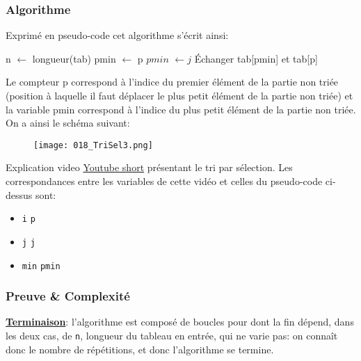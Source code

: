\documentclass[12pt]{article}
\begin{document}
	\subsubsection*{Algorithme}
	\begin{MaReponse}
		Exprimé en pseudo-code cet algorithme s'écrit ainsi:
		
		\begin{algorithmic}[1]
			\State n $\leftarrow$ longueur(tab)
			\State pmin $\leftarrow$ p
			\State $pmin$ $\leftarrow j$
			\EndIf
			\EndFor
			\State Échanger tab[pmin] et tab[p]
			\EndFor
			\State{}
			\EndFunction
		\end{algorithmic}
		
		Le compteur p correspond à l'indice du premier élément de la partie non triée (position à laquelle il faut déplacer le plus petit élément de la partie non triée) et la variable pmin correspond à l’indice du plus petit élément de la partie non triée. On a ainsi le schéma suivant:
		\begin{figure}[H]
			\centering
			\texttt{[image: 018\_TriSel3.png]}
		\end{figure}
	\end{MaReponse}
	
	\begin{MonAmp}{Explication video}
		\href{https://www.youtube.com/shorts/HRwi5gwlB0U?feature=share}{Youtube short} présentant le tri par sélection. Les correspondances entre les variables de cette vidéo et celles du pseudo-code ci-dessus sont:
		\begin{itemize}
			\item \texttt{i} \quad \faExchange \quad \texttt{p}
			\item \texttt{j} \quad \faExchange \quad \texttt{j}
			\item \texttt{min} \quad \faExchange \quad \texttt{pmin}
		\end{itemize}
	\end{MonAmp}
	
	\subsubsection*{Preuve \& Complexité}
	\textbf{\uline{Terminaison}}: l'algorithme est composé de boucles pour dont la fin dépend, dans les deux cas, de \texttt{n}, longueur du tableau en entrée, qui ne varie pas: on connaît donc le nombre de répétitions, et donc l'algorithme se termine.
	
\end{document}
